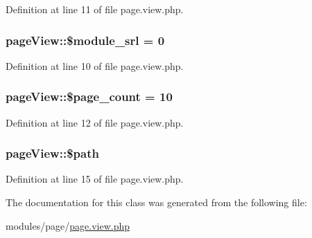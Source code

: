 Definition at line 11 of file page.\+view.\+php.

\hypertarget{classpageView_add2f52835c01c951adb6b79453417cdf}{
\subsubsection[{\$module\+\_\+srl}]{\setlength{\rightskip}{0pt plus 5cm}page\+View\+::\$module\+\_\+srl = 0}}\label{classpageView_add2f52835c01c951adb6b79453417cdf}


Definition at line 10 of file page.\+view.\+php.

\hypertarget{classpageView_a2f62b83f9128e0ccbec4a02dbb46962a}{
\subsubsection[{\$page\+\_\+count}]{\setlength{\rightskip}{0pt plus 5cm}page\+View\+::\$page\+\_\+count = 10}}\label{classpageView_a2f62b83f9128e0ccbec4a02dbb46962a}


Definition at line 12 of file page.\+view.\+php.

\hypertarget{classpageView_ac629942e1cd4eacbca09412968f4c8e3}{
\subsubsection[{\$path}]{\setlength{\rightskip}{0pt plus 5cm}page\+View\+::\$path}}\label{classpageView_ac629942e1cd4eacbca09412968f4c8e3}


Definition at line 15 of file page.\+view.\+php.



The documentation for this class was generated from the following file\+:\begin{DoxyCompactItemize}
\item 
modules/page/\hyperlink{page_8view_8php}{page.\+view.\+php}\end{DoxyCompactItemize}
